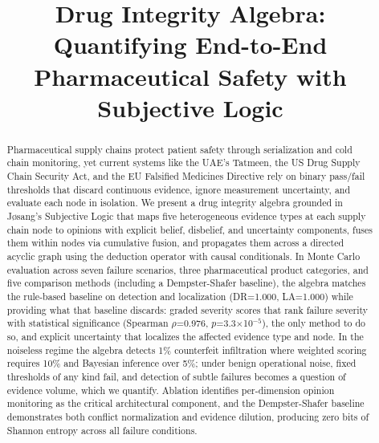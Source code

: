 \documentclass[conference]{IEEEtran}
\begin{document}
\title{Drug Integrity Algebra: Quantifying End-to-End\\Pharmaceutical Safety with Subjective Logic}

\author{
}

\maketitle

\begin{abstract}
Pharmaceutical supply chains protect patient safety through serialization
and cold chain monitoring, yet current systems like the UAE's Tatmeen,
the US Drug Supply Chain Security Act, and the EU Falsified Medicines
Directive rely on binary pass/fail thresholds that discard continuous
evidence, ignore measurement uncertainty, and evaluate each node in
isolation. We present a drug integrity algebra grounded in J\o sang's
Subjective Logic that maps five heterogeneous evidence types at each
supply chain node to opinions with explicit belief, disbelief, and
uncertainty components, fuses them within nodes via cumulative fusion,
and propagates them across a directed acyclic graph using the deduction
operator with causal conditionals. In Monte Carlo evaluation across
seven failure scenarios, three pharmaceutical product categories, and
five comparison methods (including a Dempster-Shafer baseline), the
algebra matches the rule-based baseline on detection and localization
(DR=1.000, LA=1.000) while providing what that baseline discards: graded
severity scores that rank failure severity with statistical significance
(Spearman $\rho$=0.976, $p$=3.3$\times$10$^{-5}$), the only method to do
so, and explicit uncertainty that localizes the affected evidence type
and node. In the noiseless regime the algebra detects 1\% counterfeit
infiltration where weighted scoring requires 10\% and Bayesian inference
over 5\%; under benign operational noise, fixed thresholds of any kind
fail, and detection of subtle failures becomes a question of evidence
volume, which we quantify. Ablation identifies per-dimension opinion
monitoring as the critical architectural component, and the
Dempster-Shafer baseline demonstrates both conflict normalization and
evidence dilution, producing zero bits of Shannon entropy across all
failure conditions.
\end{abstract}
\end{document}
